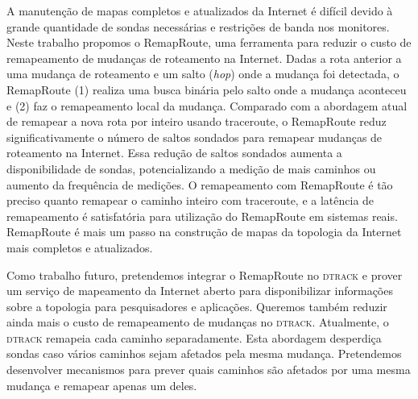 \documentclass{JBCS}
\newcommand{\dtrack}{\textsc{dtrack}}
\newcommand{\rmprt}{{Re\-map\-Rou\-te}}
\begin{document}
A manutenção de mapas completos e atualizados da Internet é difícil
devido à grande quantidade de sondas necessárias e restrições de banda
nos monitores.  Neste trabalho propomos o \rmprt{}, uma ferramenta para
reduzir o custo de remapeamento de mudanças de roteamento na Internet.
Dadas a rota anterior a uma mudança de roteamento e um salto
(\emph{hop}) onde a mudança foi detectada, o \rmprt{} (1) realiza uma
busca binária pelo salto onde a mudança aconteceu e (2) faz o
remapeamento local da mudança.  Comparado com a abordagem atual de
remapear a nova rota por inteiro usando traceroute, o \rmprt{} reduz
significativamente o número de saltos sondados para remapear mudanças de
roteamento na Internet.  Essa redução de saltos sondados aumenta a
disponibilidade de sondas, potencializando a medição de mais caminhos ou
aumento da frequência de medições.  O remapeamento com \rmprt{} é tão
preciso quanto remapear o caminho inteiro com traceroute, e a latência
de remapeamento é satisfatória para utilização do \rmprt{} em sistemas
reais.  \rmprt{} é mais um passo na construção de mapas da topologia da
Internet mais completos e atualizados.

Como trabalho futuro, pretendemos integrar o \rmprt{} no \dtrack{} e
prover um serviço de mapeamento da Internet aberto para disponibilizar
informações sobre a topologia para pesquisadores e aplicações.  Queremos
também reduzir ainda mais o custo de remapeamento de mudanças no
\dtrack{}.  Atualmente, o \dtrack{} remapeia cada caminho separadamente.
Esta abordagem desperdiça sondas caso vários caminhos sejam afetados
pela mesma mudança.  Pretendemos desenvolver mecanismos para prever
quais caminhos são afetados por uma mesma mudança e remapear apenas um
deles.




\end{document}
